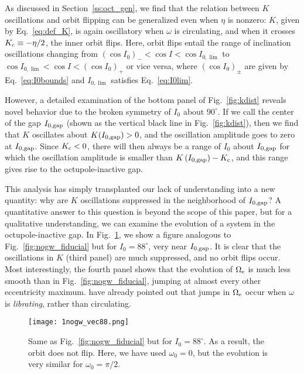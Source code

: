 \documentclass[
        fleqn,
        usenatbib,
    ]{mnras}
\newcommand*{\p}[1]{\left(#1\right)}
\newlength{\colummwidth}
\begin{document}
As discussed in Section~\ref{ss:oct_gen}, we find that the relation between $K$
oscillations and orbit flipping can be generalized even when $\eta$ is nonzero:
$K$, given by Eq.~\eqref{eq:def_K}, is again oscillatory when $\omega$ is
circulating, and when it crosses $K_{\rm c} \equiv -\eta / 2$, the inner orbit
flips. Here, orbit flips entail the range of inclination oscillations changing
from $\p{\cos I_0}_- < \cos I < \cos I_{0, \lim}$ to $\cos I_{0, \lim} < \cos I
< \p{\cos I_0}_+$ or vice versa, where $\p{\cos I_0}_{\pm}$ are given by
Eq.~\eqref{eq:I0bounds} and $I_{0, \lim}$ satisfies Eq.~\eqref{eq:I0lim}.

However, a detailed examination of the bottom panel of Fig.~\ref{fig:kdist}
reveals novel behavior due to the broken symmetry of $I_0$ about $90^\circ$. If
we call the center of the gap $I_{\rm 0, gap}$ (shown as the vertical black line in
Fig.~\ref{fig:kdist}), then we find that $K$ oscillates about $K(I_{\rm 0, gap}) >
0$, and the oscillation amplitude goes to zero at $I_{\rm 0, gap}$. Since $K_{\rm
c} < 0$, there will then always be a range of $I_0$ about $I_{\rm 0, gap}$ for
which the oscillation amplitude is smaller than $K\p{I_{\rm 0, gap}} - K_{\rm c}$,
and this range gives rise to the octupole-inactive gap.

This analysis has simply transplanted our lack of understanding into a new
quantity: why are $K$ oscillations suppressed in the neighborhood of $I_{\rm
0, gap}$? A quantitative answer to this question is beyond the scope of this
paper, but for a qualitative understanding, we can examine the evolution of a
system in the octupole-inactive gap. In Fig.~\ref{fig:nogw_circ}, we show a
figure analogous to Fig.~\ref{fig:nogw_fiducial} but for $I_0 = 88^\circ$, very
near $I_{\rm 0, gap}$. It is clear that the oscillations in $K$ (third panel)
are much suppressed, and no orbit flips occur. Most interestingly, the fourth
panel shows that the evolution of $\Omega_{\rm e}$ is much less smooth than in
Fig.~\ref{fig:nogw_fiducial}, jumping at almost every other eccentricity
maximum. \citet{katz2011long} have already pointed out that jumps in
$\Omega_{\rm e}$ occur when $\omega$ is \emph{librating}, rather than
circulating.

\begin{figure}
    \centering
    \texttt{[image: 1nogw\_vec88.png]}
    \caption{Same as Fig.~\ref{fig:nogw_fiducial} but for $I_0 = 88^\circ$. As a
    result, the orbit does not flip. Here, we have used $\omega_0 = 0$, but the
    evolution is very similar for $\omega_0 = \pi / 2$.}\label{fig:nogw_circ}
\end{figure}
\end{document}
